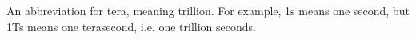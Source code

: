 An abbreviation for tera, meaning trillion. For example, 1s means
one second, but 1Ts means one terasecond, i.e. one trillion seconds.